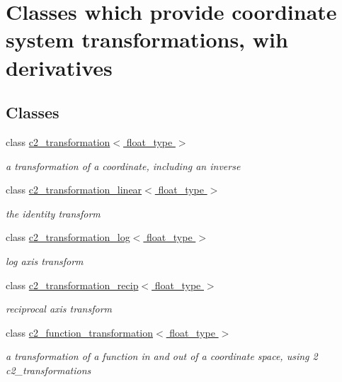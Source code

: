 \hypertarget{group__transforms}{\section{Classes which provide coordinate system transformations, wih derivatives}
\label{group__transforms}
}
\subsection*{Classes}
\begin{DoxyCompactItemize}
\item 
class \hyperlink{classc2__transformation}{c2\-\_\-transformation$<$ float\-\_\-type $>$}
\begin{DoxyCompactList}\small\item\em a transformation of a coordinate, including an inverse \end{DoxyCompactList}\item 
class \hyperlink{classc2__transformation__linear}{c2\-\_\-transformation\-\_\-linear$<$ float\-\_\-type $>$}
\begin{DoxyCompactList}\small\item\em the identity transform \end{DoxyCompactList}\item 
class \hyperlink{classc2__transformation__log}{c2\-\_\-transformation\-\_\-log$<$ float\-\_\-type $>$}
\begin{DoxyCompactList}\small\item\em log axis transform \end{DoxyCompactList}\item 
class \hyperlink{classc2__transformation__recip}{c2\-\_\-transformation\-\_\-recip$<$ float\-\_\-type $>$}
\begin{DoxyCompactList}\small\item\em reciprocal axis transform \end{DoxyCompactList}\item 
class \hyperlink{classc2__function__transformation}{c2\-\_\-function\-\_\-transformation$<$ float\-\_\-type $>$}
\begin{DoxyCompactList}\small\item\em a transformation of a function in and out of a coordinate space, using 2 c2\-\_\-transformations \end{DoxyCompactList}\item 

\end{DoxyCompactItemize}
